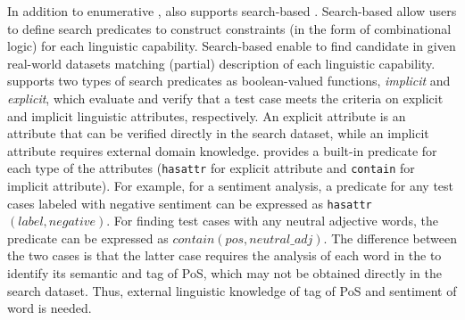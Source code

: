 


In addition to enumerative \phs, \tool also supports search-based \phs. Search-based \phs allow users to define search predicates to construct constraints (in the form of combinational logic) for each linguistic capability.
Search-based \phs enable \tool to find candidate \sents in given 
real-world datasets matching (partial) 
description of each linguistic capability.
\tool supports two types of search predicates as boolean-valued functions, \emph{implicit} and 
\emph{explicit}, which evaluate and verify
that a test case meets the criteria on explicit and implicit linguistic attributes, respectively.
An explicit attribute is an attribute that can be verified directly in the search dataset, while an implicit attribute requires external domain knowledge.
\tool provides a built-in predicate for each type of the attributes (\texttt{hasattr} for explicit attribute and \texttt{contain} for implicit attribute).
For example, for a sentiment analysis, a predicate for any test cases labeled with negative sentiment can be expressed as 
\texttt{hasattr}$(label, negative)$.
For finding test cases with  any neutral adjective words, the predicate can be expressed as $contain(pos, neutral\_adj)$.
The difference between the two cases is that the latter case requires the analysis of each word in the \sent
to identify its semantic and tag of PoS, which may  
not be obtained directly in the search dataset.
Thus, external linguistic  knowledge of tag of PoS and sentiment of word is needed.

